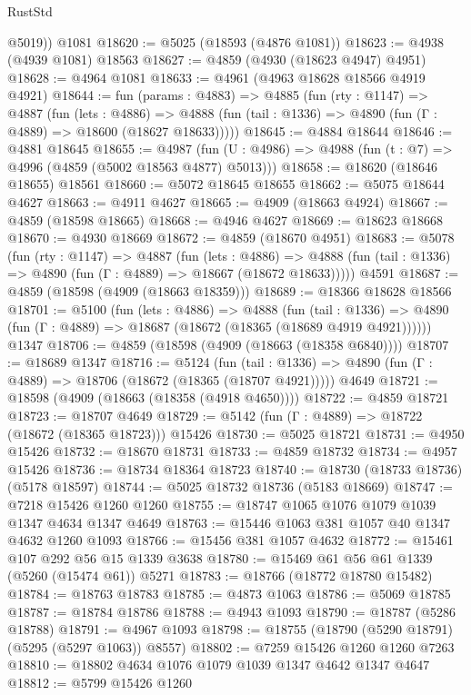 \begin{lexlean}{RustStd}
\begin{coremodule}
        @5019))
    @1081
@18620 := @5025 (@18593 (@4876 @1081))
@18623 := @4938 (@4939 @1081) @18563
@18627 := @4859 (@4930 (@18623 @4947) @4951)
@18628 := @4964 @1081
@18633 := @4961 (@4963 @18628 @18566 @4919 @4921)
@18644 := fun (params : @4883) =>
  @4885
    (fun (rty : @1147) =>
    @4887
      (fun (lets : @4886) =>
      @4888 (fun (tail : @1336) => @4890 (fun (Γ : @4889) => @18600 (@18627 @18633)))))
@18645 := @4884 @18644
@18646 := @4881 @18645
@18655 := @4987
    (fun (U : @4986) => @4988 (fun (t : @7) => @4996 (@4859 (@5002 @18563 @4877) @5013)))
@18658 := @18620 (@18646 @18655) @18561
@18660 := @5072 @18645 @18655
@18662 := @5075 @18644 @4627
@18663 := @4911 @4627
@18665 := @4909 (@18663 @4924)
@18667 := @4859 (@18598 @18665)
@18668 := @4946 @4627
@18669 := @18623 @18668
@18670 := @4930 @18669
@18672 := @4859 (@18670 @4951)
@18683 := @5078
    (fun (rty : @1147) =>
    @4887
      (fun (lets : @4886) =>
      @4888 (fun (tail : @1336) => @4890 (fun (Γ : @4889) => @18667 (@18672 @18633)))))
    @4591
@18687 := @4859 (@18598 (@4909 (@18663 @18359)))
@18689 := @18366 @18628 @18566
@18701 := @5100
    (fun (lets : @4886) =>
    @4888
      (fun (tail : @1336) =>
      @4890 (fun (Γ : @4889) => @18687 (@18672 (@18365 (@18689 @4919 @4921))))))
    @1347
@18706 := @4859 (@18598 (@4909 (@18663 (@18358 @6840))))
@18707 := @18689 @1347
@18716 := @5124
    (fun (tail : @1336) => @4890 (fun (Γ : @4889) => @18706 (@18672 (@18365 (@18707 @4921)))))
    @4649
@18721 := @18598 (@4909 (@18663 (@18358 (@4918 @4650))))
@18722 := @4859 @18721
@18723 := @18707 @4649
@18729 := @5142 (fun (Γ : @4889) => @18722 (@18672 (@18365 @18723))) @15426
@18730 := @5025 @18721
@18731 := @4950 @15426
@18732 := @18670 @18731
@18733 := @4859 @18732
@18734 := @4957 @15426
@18736 := @18734 @18364 @18723
@18740 := @18730 (@18733 @18736) (@5178 @18597)
@18744 := @5025 @18732 @18736 (@5183 @18669)
@18747 := @7218 @15426 @1260 @1260
@18755 := @18747 @1065 @1076 @1079 @1039 @1347 @4634 @1347 @4649
@18763 := @15446 @1063 @381 @1057 @40 @1347 @4632 @1260 @1093
@18766 := @15456 @381 @1057 @4632
@18772 := @15461 @107 @292 @56 @15 @1339 @3638
@18780 := @15469 @61 @56 @61 @1339 (@5260 (@15474 @61)) @5271
@18783 := @18766 (@18772 @18780 @15482)
@18784 := @18763 @18783
@18785 := @4873 @1063
@18786 := @5069 @18785
@18787 := @18784 @18786
@18788 := @4943 @1093
@18790 := @18787 (@5286 @18788)
@18791 := @4967 @1093
@18798 := @18755 (@18790 (@5290 @18791) (@5295 (@5297 @1063)) @8557)
@18802 := @7259 @15426 @1260 @1260 @7263
@18810 := @18802 @4634 @1076 @1079 @1039 @1347 @4642 @1347 @4647
@18812 := @5799 @15426 @1260

\end{coremodule}
\end{lexlean}
